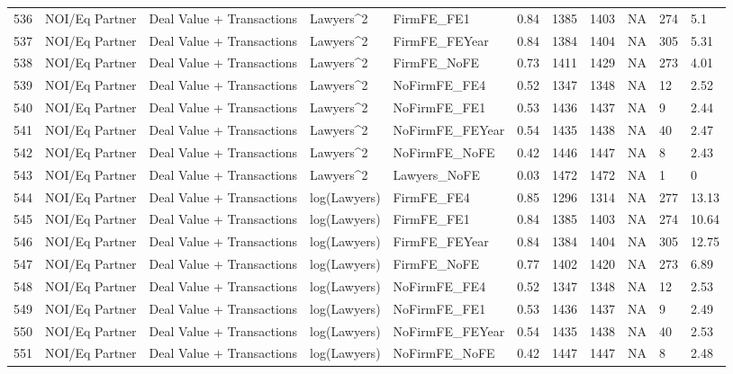 \begin{table}[ht]
\begin{tabular}{rllllllllll}
  536 & NOI/Eq Partner & Deal Value + Transactions & Lawyers^2 & FirmFE\_FE1 & 0.84 & 1385 & 1403 & NA & 274 & 5.1 \\ 
  537 & NOI/Eq Partner & Deal Value + Transactions & Lawyers^2 & FirmFE\_FEYear & 0.84 & 1384 & 1404 & NA & 305 & 5.31 \\ 
  538 & NOI/Eq Partner & Deal Value + Transactions & Lawyers^2 & FirmFE\_NoFE & 0.73 & 1411 & 1429 & NA & 273 & 4.01 \\ 
  539 & NOI/Eq Partner & Deal Value + Transactions & Lawyers^2 & NoFirmFE\_FE4 & 0.52 & 1347 & 1348 & NA & 12 & 2.52 \\ 
  540 & NOI/Eq Partner & Deal Value + Transactions & Lawyers^2 & NoFirmFE\_FE1 & 0.53 & 1436 & 1437 & NA & 9 & 2.44 \\ 
  541 & NOI/Eq Partner & Deal Value + Transactions & Lawyers^2 & NoFirmFE\_FEYear & 0.54 & 1435 & 1438 & NA & 40 & 2.47 \\ 
  542 & NOI/Eq Partner & Deal Value + Transactions & Lawyers^2 & NoFirmFE\_NoFE & 0.42 & 1446 & 1447 & NA & 8 & 2.43 \\ 
  543 & NOI/Eq Partner & Deal Value + Transactions & Lawyers^2 & Lawyers\_NoFE & 0.03 & 1472 & 1472 & NA & 1 & 0 \\ 
  544 & NOI/Eq Partner & Deal Value + Transactions & log(Lawyers) & FirmFE\_FE4 & 0.85 & 1296 & 1314 & NA & 277 & 13.13 \\ 
  545 & NOI/Eq Partner & Deal Value + Transactions & log(Lawyers) & FirmFE\_FE1 & 0.84 & 1385 & 1403 & NA & 274 & 10.64 \\ 
  546 & NOI/Eq Partner & Deal Value + Transactions & log(Lawyers) & FirmFE\_FEYear & 0.84 & 1384 & 1404 & NA & 305 & 12.75 \\ 
  547 & NOI/Eq Partner & Deal Value + Transactions & log(Lawyers) & FirmFE\_NoFE & 0.77 & 1402 & 1420 & NA & 273 & 6.89 \\ 
  548 & NOI/Eq Partner & Deal Value + Transactions & log(Lawyers) & NoFirmFE\_FE4 & 0.52 & 1347 & 1348 & NA & 12 & 2.53 \\ 
  549 & NOI/Eq Partner & Deal Value + Transactions & log(Lawyers) & NoFirmFE\_FE1 & 0.53 & 1436 & 1437 & NA & 9 & 2.49 \\ 
  550 & NOI/Eq Partner & Deal Value + Transactions & log(Lawyers) & NoFirmFE\_FEYear & 0.54 & 1435 & 1438 & NA & 40 & 2.53 \\ 
  551 & NOI/Eq Partner & Deal Value + Transactions & log(Lawyers) & NoFirmFE\_NoFE & 0.42 & 1447 & 1447 & NA & 8 & 2.48 \\ 

\end{tabular}
\end{table}
